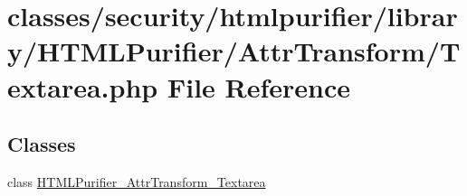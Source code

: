\hypertarget{Textarea_8php}{\section{classes/security/htmlpurifier/library/\+H\+T\+M\+L\+Purifier/\+Attr\+Transform/\+Textarea.php File Reference}
\label{Textarea_8php}
}
\subsection*{Classes}
\begin{DoxyCompactItemize}
\item 
class \hyperlink{classHTMLPurifier__AttrTransform__Textarea}{H\+T\+M\+L\+Purifier\+\_\+\+Attr\+Transform\+\_\+\+Textarea}
\end{DoxyCompactItemize}
